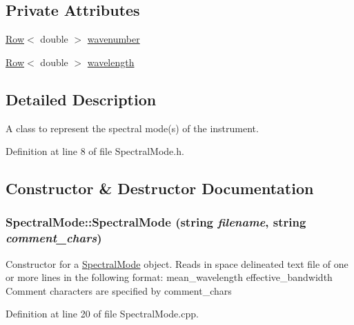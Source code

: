 \subsection*{Private Attributes}
\begin{DoxyCompactItemize}
\item 
\hyperlink{classRow}{Row}$<$ double $>$ \hyperlink{classSpectralMode_aa843aedc510953af4fb64b4dd41e3e22}{wavenumber}
\item 
\hyperlink{classRow}{Row}$<$ double $>$ \hyperlink{classSpectralMode_ac56b7c0c01e1f396bef1b192b6365add}{wavelength}
\end{DoxyCompactItemize}


\subsection{Detailed Description}
A class to represent the spectral mode(s) of the instrument. 

Definition at line 8 of file SpectralMode.h.



\subsection{Constructor \& Destructor Documentation}
\hypertarget{classSpectralMode_abfb56a691dd864cfc5f93357ee7a3eee}{
\subsubsection[{SpectralMode}]{\setlength{\rightskip}{0pt plus 5cm}SpectralMode::SpectralMode (string {\em filename}, \/  string {\em comment\_\-chars})}}
\label{classSpectralMode_abfb56a691dd864cfc5f93357ee7a3eee}
Constructor for a \hyperlink{classSpectralMode}{SpectralMode} object. Reads in space delineated text file of one or more lines in the following format: mean\_\-wavelength effective\_\-bandwidth Comment characters are specified by comment\_\-chars 

Definition at line 20 of file SpectralMode.cpp.

